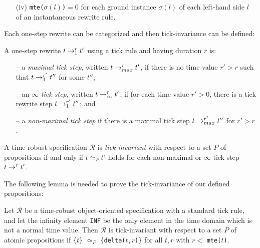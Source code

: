{\begin{lemma}
\begin{enumerate}
\item
[(iv)] \verb|mte(|$\sigma(l)$\verb|)|$= 0$ for each ground instance
$\sigma(l)$ of each left-hand side $l$ of an instantaneous rewrite
rule.
\end{enumerate}
\end{lemma}

Each one-step rewrite can be categorized and then tick-invariance can
be defined:
\begin{definition}
A one-step rewrite $t\rightarrow^{r}_{1}t'$ using a tick rule and having
duration $r$ is:
\begin{itemize}
\item[--] a \emph{maximal tick step}, written $t\rightarrow^{r}_{max}t'$, if
  there is no time value $r'>r$ such that $t\rightarrow^{r'}_{1}t''$ for some
  $t''$;
\item[--] an \emph{$\infty$ tick step}, written $t\rightarrow^{r}_{\infty}t'$,
  if for each time value $r'>0$, there is a tick rewrite step
  $t\rightarrow^{r'}_{1}t''$; and
\item[--] a \emph{non-maximal tick step} if there is a maximal tick
  step $t\rightarrow^{r'}_{max}t''$ for $r'>r$.
\end{itemize}
\end{definition}
\begin{definition}
  A time-robust specification $\mathcal{R}$ is \emph{tick-invariant} with
  respect to a set $P$ of propositions if and only if $t\simeq_P t'$
  holds for each non-maximal or $\infty$ tick step $t\rightarrow^{r}_{}t'$.
\end{definition}

The following lemma is needed to prove the tick-invariance of our
defined propositions:
\begin{lemma}
\label{l:tickinv}
Let $\mathcal{R}$ be a time-robust object-oriented specification with a
standard tick rule, and let the infinity element \verb|INF| be the
only element in the time domain which is not a normal time value.
Then $\mathcal{R}$ is tick-invariant with respect to a set $P$ of atomic
propositions if \verb|{|$t$\verb|}| $\simeq_P$
\verb|{delta(|$t$\verb|,|$r$\verb|)}| for all $t,r$ with $r<$
\verb|mte(|$t$\verb|)|.
\end{lemma}

\newcommand{\mteTask}[2]{\texttt{mteTask(}#1\texttt{,}#2\texttt{)}}
\newcommand{\deltaTask}[3]{\texttt{deltaTask(}#1\texttt{,}#2\texttt{,}#3\texttt{)}}
\newcommand{\mteIS}[1]{\texttt{mteIS(}#1\texttt{)}}
\newcommand{\deltaIS}[2]{\texttt{deltaIS(}#1\texttt{,}#2\texttt{)}}
\newcommand{\IntSrc}[3]{\texttt{<}#1\texttt{:IntSrc|val:}#2\texttt{,cycle:}#3\texttt{>}}
\newcommand{\mteIr}[1]{\texttt{mteIr(}#1\texttt{)}}
\newcommand{\mteS}[1]{\texttt{mte(}#1\texttt{)}}
\newcommand{\deltaS}[2]{\texttt{delta(}#1\texttt{,}#2\texttt{)}}
 
}
